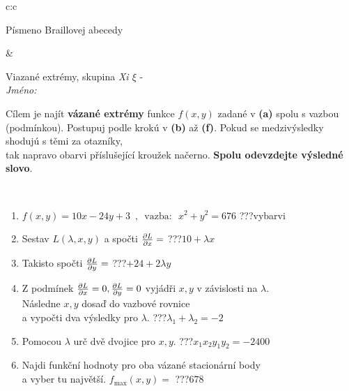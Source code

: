 \documentclass[10pt]{report}
\begin{document}
\begin{tabular}{c:c}
\begin{minipage}[c][104.5mm][t]{0.5\linewidth}
\begin{center}
\begin{minipage}{0.20\linewidth}
\begin{center}
{\small Písmeno Braillovej abecedy}
\end{center}
\end{minipage}
\end{center}
\end{minipage}
&
\begin{minipage}[c][104.5mm][t]{0.5\linewidth}
\begin{center}
\vspace{7mm}
{\huge Viazané extrémy, skupina \textit{Xi $\xi$} -}\\[5mm]
\textit{Jméno:}\phantom{xxxxxxxxxxxxxxxxxxxxxxxxxxxxxxxxxxxxxxxxxxxxxxxxxxxxxxxxxxxxxxxxx}\\[5mm]
\begin{minipage}{0.95\linewidth}
\begin{center}
Cílem je najít \textbf{vázané extrémy} funkce $f(x,y)$ zadané v \textbf{(a)} spolu s vazbou (podmínkou). Postupuj podle krokú v \textbf{(b)} až \textbf{(f)}. Pokud se medzivýsledky shodujú s těmi za otazníky,\\tak napravo obarvi příslušející kroužek načerno. \textbf{Spolu odevzdejte výsledné slovo}.
\end{center}
\end{minipage}
\\[1mm]
\begin{minipage}{0.79\linewidth}
\begin{center}
\begin{varwidth}{\linewidth}
\begin{enumerate}
\normalsize
\item $f(x,y)=10x-24y+3 \enspace , \enspace \mathrm{vazba:} \enspace x^2+y^2=676$\quad \dotfill\; ???\;\dotfill \quad vybarvi
\item Sestav $L(\lambda,x,y)$ a spočti $\pdv{L}{x}=$\quad \dotfill\; ???\;\dotfill \quad $10+\lambda x$
\item Takisto spočti $\pdv{L}{y}=$\quad \dotfill\; ???\;\dotfill \quad $+24+2\lambda y$
\item Z podmínek $\pdv{L}{x}=0 , \pdv{L}{y}=0$ vyjádři $x,y$ v závislosti na $\lambda$.\\ \phantom{xxxxxx}Následne $x,y$ dosaď do vazbové rovnice\\ \phantom{xxxxxx}a vypočti dva výsledky pro $\lambda$.\quad \dotfill\; ???\;\dotfill \quad $\lambda_1+\lambda_2=-2$
\item Pomocou $\lambda$ urč dvě dvojice pro $x,y$.\quad \dotfill\; ???\;\dotfill \quad $x_1 x_2 y_1 y_2=-2400$
\item Najdi funkční hodnoty pro oba vázané stacionární body\\ \phantom{xxxxxx}a vyber tu najvětší. $f_{\text{max}}(x,y)=$\quad \dotfill\; ???\;\dotfill \quad $678$

\end{enumerate}
\end{varwidth}
\end{center}
\end{minipage}
\end{center}
\end{minipage}
\end{tabular}
\end{document}
